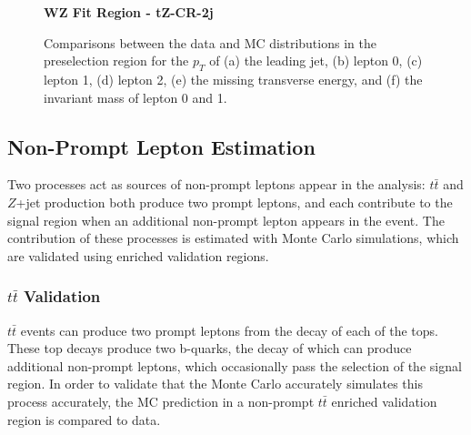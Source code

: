 \begin{figure}[H]
    \textbf{WZ Fit Region - tZ-CR-2j}\\
     \caption{Comparisons between the data and MC distributions in the preselection region for the $p_T$ of (a) the leading jet, (b) lepton 0, (c) lepton 1, (d) lepton 2, (e) the missing transverse energy, and (f) the invariant mass of lepton 0 and 1.}
    \label{kin:tZ_CR_2j}
\end{figure}

\subsection{Non-Prompt Lepton Estimation}
\label{sec:fakes}

Two processes act as sources of non-prompt leptons appear in the analysis: $t\bar{t}$ and $Z$+jet production both produce two prompt leptons, and each contribute to the signal region when an additional non-prompt lepton appears in the event. The contribution of these processes is estimated with Monte Carlo simulations, which are validated using enriched validation regions.

\subsubsection{$t\bar{t}$ Validation}

$t\bar{t}$ events can produce two prompt leptons from the decay of each of the tops. These top decays produce two b-quarks, the decay of which can produce additional non-prompt leptons, which occasionally pass the selection of the signal region. In order to validate that the Monte Carlo accurately simulates this process accurately, the MC prediction in a non-prompt $t\bar{t}$ enriched validation region is compared to data.

